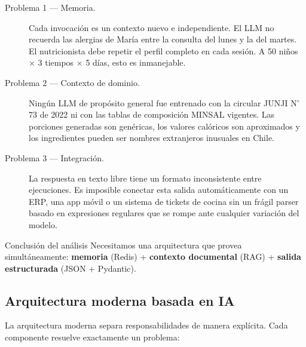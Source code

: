 \documentclass[12pt,a4paper]{article}
\begin{document}
\begin{description}
  \item[Problema 1 --- Memoria.] Cada invocación es un contexto nuevo
    e independiente. El LLM no recuerda las alergias de María entre
    la consulta del lunes y la del martes. El nutricionista debe
    repetir el perfil completo en cada sesión. A 50 niños $\times$
    3 tiempos $\times$ 5 días, esto es inmanejable.

  \item[Problema 2 --- Contexto de dominio.] Ningún LLM de propósito
    general fue entrenado con la circular JUNJI N$^{\circ}$73 de 2022
    ni con las tablas de composición MINSAL vigentes. Las porciones
    generadas son genéricas, los valores calóricos son aproximados y
    los ingredientes pueden ser nombres extranjeros inusuales en Chile.

  \item[Problema 3 --- Integración.] La respuesta en texto libre tiene
    un formato inconsistente entre ejecuciones. Es imposible conectar
    esta salida automáticamente con un ERP, una app móvil o un sistema
    de tickets de cocina sin un frágil parser basado en expresiones
    regulares que se rompe ante cualquier variación del modelo.
\end{description}

\begin{warnbox}{Conclusión del análisis}
Necesitamos una arquitectura que provea simultáneamente:
\textbf{memoria} (Redis) + \textbf{contexto documental} (RAG) +
\textbf{salida estructurada} (JSON + Pydantic).
\end{warnbox}

\subsection{Arquitectura moderna basada en IA}

La arquitectura moderna separa responsabilidades de manera explícita.
Cada componente resuelve exactamente un problema:
\end{document}
